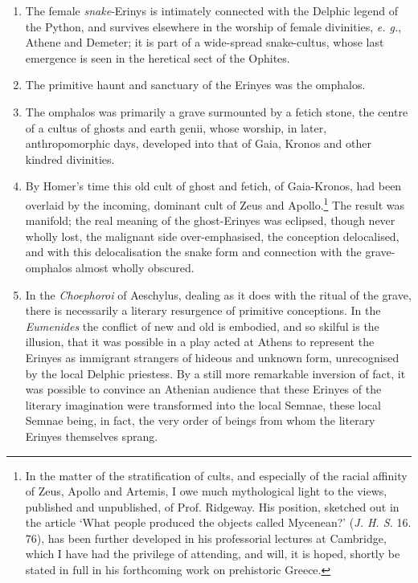 \documentclass[a4paper, 11pt, oneside, polutonikogreek, english]{article}
\begin{document}
\begin{enumerate}
    \item The female \emph{snake}-Erinys is intimately connected with the Delphic legend of the Python, and survives elsewhere in the worship of female divinities, \emph{e. g.}, Athene and Demeter; it is part of a wide-spread snake-cultus, whose last emergence is seen in the heretical sect of the Ophites.

    \item The primitive haunt and sanctuary of the Erinyes was the omphalos.

    \item The omphalos was primarily a grave surmounted by a fetich stone, the centre of a cultus of ghosts and earth genii, whose worship, in later, anthropomorphic days, developed into that of Gaia, Kronos and other kindred divinities.

    \item By Homer's time this old cult of ghost and fetich, of Gaia-Kronos, had been overlaid by the incoming, dominant cult of Zeus and Apollo.\footnote{In the matter of the stratification of cults, and especially of the racial affinity of Zeus, Apollo and Artemis, I owe much mythological light to the views, published and unpublished, of Prof. Ridgeway. His position, sketched out in the article `What people produced the objects called Mycenean?' (\emph{J. H. S.} 16. 76), has been further developed in his professorial lectures at Cambridge, which I have had the privilege of attending, and will, it is hoped, shortly be stated in full in his forthcoming work on prehistoric Greece.} The result was manifold; the real meaning of the ghost-Erinyes was eclipsed, though never wholly lost, the malignant side over-emphasised, the conception delocalised, and with this delocalisation the snake form and connection with the grave-omphalos almost wholly obscured.

    \item In the \emph{Choephoroi} of Aeschylus, dealing as it does with the ritual of the grave, there is necessarily a literary resurgence of primitive conceptions. In the \emph{Eumenides} the conflict of new and old is embodied, and so skilful is the illusion, that it was possible in a play acted at Athens to represent the Erinyes as immigrant strangers of hideous and unknown form, unrecognised by the local Delphic priestess. By a still more remarkable inversion of fact, it was possible to convince an Athenian audience that these Erinyes of the literary imagination were transformed into the local Semnae, these local Semnae being, in fact, the very order of beings from whom the literary Erinyes themselves sprang.
\end{enumerate}
\clearpage
\end{document}
